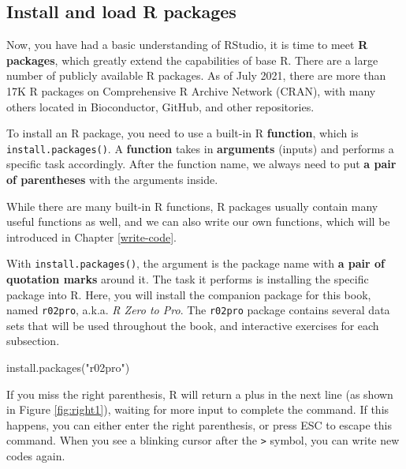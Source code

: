 \documentclass[
]{book}
\newenvironment{Shaded}{\begin{snugshade}}{\end{snugshade}}
\newcommand{\FunctionTok}[1]{\textcolor[rgb]{0.00,0.00,0.00}{#1}}
\newcommand{\NormalTok}[1]{#1}
\newcommand{\StringTok}[1]{\textcolor[rgb]{0.31,0.60,0.02}{#1}}
\newenvironment{blackbox}{
  \definecolor{shadecolor}{rgb}{0, 0, 0}  %
  \color{white}
  \begin{shaded}}
 {\end{shaded}}
\newenvironment{infobox}[1]
  {
  \begin{itemize}
  \renewcommand{\labelitemi}{
    \raisebox{-.7\height}[0pt][0pt]{
      {\setkeys{Gin}{width=3em,keepaspectratio}
        \texttt{[image: pics/\#1]}}
    }
  }
  \setlength{\fboxsep}{1em}
  \begin{blackbox}
  \item
  }
  {
  \end{blackbox}
  \end{itemize}
  }
\begin{document}
\hypertarget{install-and-load-r-packages}{%
\subsection{Install and load R packages}\label{install-and-load-r-packages}}

Now, you have had a basic understanding of RStudio, it is time to meet \textbf{R packages}, which greatly extend the capabilities of base R. There are a large number of publicly available R packages. As of July 2021, there are more than 17K R packages on Comprehensive R Archive Network (CRAN), with many others located in Bioconductor, GitHub, and other repositories.

To install an R package, you need to use a built-in R \textbf{function}, which is \texttt{install.packages()}. A \textbf{function} takes in \textbf{arguments} (inputs) and performs a specific task accordingly. After the function name, we always need to put \textbf{a pair of parentheses} with the arguments inside.

While there are many built-in R functions, R packages usually contain many useful functions as well, and we can also write our own functions, which will be introduced in Chapter \ref{write-code}.

With \texttt{install.packages()}, the argument is the package name with \textbf{a pair of quotation marks} around it. The task it performs is installing the specific package into R. Here, you will install the companion package for this book, named \texttt{r02pro}, a.k.a. \emph{R Zero to Pro}. The \texttt{r02pro} package contains several data sets that will be used throughout the book, and interactive exercises for each subsection.

\begin{Shaded}
\begin{Highlighting}[]
\FunctionTok{install.packages}\NormalTok{(}\StringTok{"r02pro"}\NormalTok{)}
\end{Highlighting}
\end{Shaded}

\begin{infobox}{caution}
If you miss the right parenthesis, R will return a plus in the next line (as shown in Figure \ref{fig:right1}), waiting for more input to complete the command. If this happens, you can either enter the right parenthesis, or press ESC to escape this command. When you see a blinking cursor after the \texttt{\textgreater{}} symbol, you can write new codes again.

\end{infobox}
\end{document}

